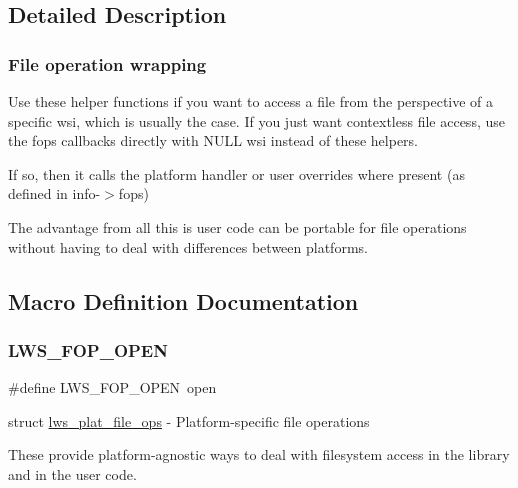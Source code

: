 \subsection{Detailed Description}
\subsubsection*{File operation wrapping}

Use these helper functions if you want to access a file from the perspective of a specific wsi, which is usually the case. If you just want contextless file access, use the fops callbacks directly with N\+U\+LL wsi instead of these helpers.

If so, then it calls the platform handler or user overrides where present (as defined in info-\/$>$fops)

The advantage from all this is user code can be portable for file operations without having to deal with differences between platforms. 

\subsection{Macro Definition Documentation}
\mbox{\label{group__fops_ga7972d4b546c7af37bb76d4c60f2ad553}} 
\subsubsection{\texorpdfstring{L\+W\+S\+\_\+\+F\+O\+P\+\_\+\+O\+P\+EN}{LWS\_FOP\_OPEN}\hspace{0.1cm}{\footnotesize\ttfamily [1/6]}}
{\footnotesize\ttfamily \#define L\+W\+S\+\_\+\+F\+O\+P\+\_\+\+O\+P\+EN~open}

struct \hyperlink{structlws__plat__file__ops}{lws\+\_\+plat\+\_\+file\+\_\+ops} -\/ Platform-\/specific file operations

These provide platform-\/agnostic ways to deal with filesystem access in the library and in the user code. \mbox{\label{group__fops_ga7972d4b546c7af37bb76d4c60f2ad553}} 
